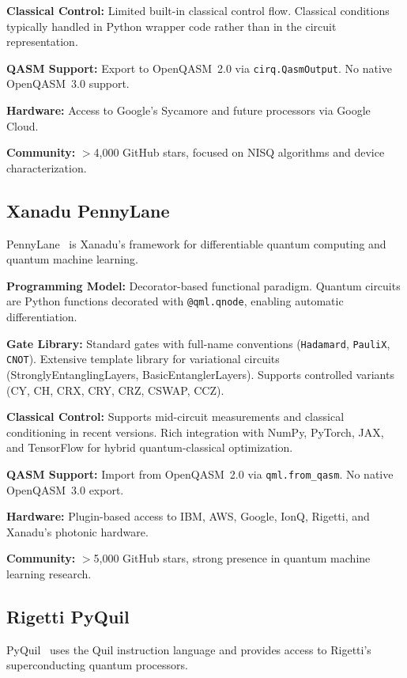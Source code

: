 \documentclass[journal]{IEEEtran}
\begin{document}
\textbf{Classical Control:} Limited built-in classical control flow. Classical conditions typically handled in Python wrapper code rather than in the circuit representation.

\textbf{QASM Support:} Export to OpenQASM~2.0 via \texttt{cirq.QasmOutput}. No native OpenQASM~3.0 support.

\textbf{Hardware:} Access to Google's Sycamore and future processors via Google Cloud.

\textbf{Community:} $>$4,000 GitHub stars, focused on NISQ algorithms and device characterization.

\subsection{Xanadu PennyLane}

PennyLane~\cite{pennylane2024} is Xanadu's framework for differentiable quantum computing and quantum machine learning.

\textbf{Programming Model:} Decorator-based functional paradigm. Quantum circuits are Python functions decorated with \texttt{@qml.qnode}, enabling automatic differentiation.

\textbf{Gate Library:} Standard gates with full-name conventions (\texttt{Hadamard}, \texttt{PauliX}, \texttt{CNOT}). Extensive template library for variational circuits (StronglyEntanglingLayers, BasicEntanglerLayers). Supports controlled variants (CY, CH, CRX, CRY, CRZ, CSWAP, CCZ).

\textbf{Classical Control:} Supports mid-circuit measurements and classical conditioning in recent versions. Rich integration with NumPy, PyTorch, JAX, and TensorFlow for hybrid quantum-classical optimization.

\textbf{QASM Support:} Import from OpenQASM~2.0 via \texttt{qml.from\_qasm}. No native OpenQASM~3.0 export.

\textbf{Hardware:} Plugin-based access to IBM, AWS, Google, IonQ, Rigetti, and Xanadu's photonic hardware.

\textbf{Community:} $>$5,000 GitHub stars, strong presence in quantum machine learning research.

\subsection{Rigetti PyQuil}

PyQuil~\cite{smith2016practical} uses the Quil instruction language and provides access to Rigetti's superconducting quantum processors.
\end{document}
